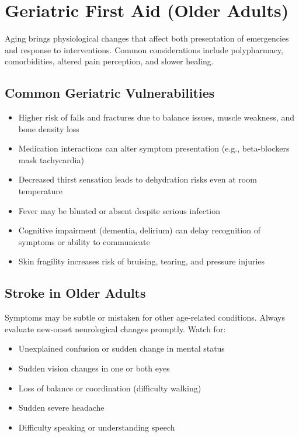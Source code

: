 \section{Geriatric First Aid (Older Adults)}

Aging brings physiological changes that affect both presentation of emergencies and response to interventions. Common considerations include polypharmacy, comorbidities, altered pain perception, and slower healing.

\subsection{Common Geriatric Vulnerabilities}

\begin{itemize}[leftmargin=*]
  \item Higher risk of falls and fractures due to balance issues, muscle weakness, and bone density loss
  \item Medication interactions can alter symptom presentation (e.g., beta-blockers mask tachycardia)
  \item Decreased thirst sensation leads to dehydration risks even at room temperature
  \item Fever may be blunted or absent despite serious infection
  \item Cognitive impairment (dementia, delirium) can delay recognition of symptoms or ability to communicate
  \item Skin fragility increases risk of bruising, tearing, and pressure injuries
\end{itemize}

\subsection{Stroke in Older Adults}

Symptoms may be subtle or mistaken for other age-related conditions. Always evaluate new-onset neurological changes promptly. Watch for:

\begin{itemize}[leftmargin=*]
  \item Unexplained confusion or sudden change in mental status
  \item Sudden vision changes in one or both eyes
  \item Loss of balance or coordination (difficulty walking)
  \item Sudden severe headache
  \item Difficulty speaking or understanding speech
\end{itemize}

